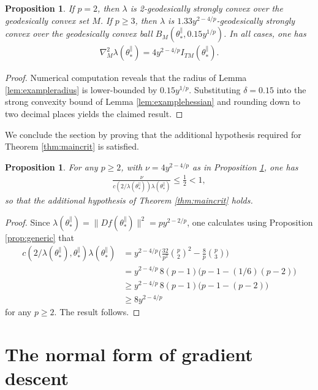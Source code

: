 \documentclass{article}
\newcommand{\tpa}{\theta^{\parallel}}
\theoremstyle{plain}
\newtheorem{proposition}[theorem]{Proposition}
\theoremstyle{definition}
\theoremstyle{remark}
\begin{document}
\begin{proposition}\label{prop:convex}
    If $p=2$, then $\lambda$ is 2-geodesically strongly convex over the geodesically convex set $M$. If $p\geq 3$, then $\lambda$ is $1.33y^{2-4/p}$-geodesically strongly convex over the geodesically convex ball $B_M(\tpa_*,0.15y^{1/p})$. In all cases, one has
    \begin{align}
        \nabla^2_M\lambda(\tpa_*) = 4y^{2-4/p}I_{TM}(\tpa_*).
    \end{align}
\end{proposition}

\begin{proof}
    Numerical computation reveals that the radius of Lemma \ref{lem:exampleradius} is lower-bounded by $0.15y^{1/p}$. Substituting $\delta = 0.15$ into the strong convexity bound of Lemma \ref{lem:examplehessian} and rounding down to two decimal places yields the claimed result.
\end{proof}

We conclude the section by proving that the additional hypothesis required for Theorem \ref{thm:maincrit} is satisfied.

\begin{proposition}\label{prop:additional}
    For any $p\geq 2$, with $\nu = 4y^{2-4/p}$ as in Proposition \ref{prop:convex}, one has
    \begin{align}
        \frac{\nu}{c(2/\lambda(\tpa_*))\lambda(\tpa_*)} \leq\frac{1}{2}<1,
    \end{align}
    so that the additional hypothesis of Theorem \ref{thm:maincrit} holds.
\end{proposition}

\begin{proof}
    Since $\lambda(\tpa_*) = \|Df(\tpa_*)\|^2 = py^{2-2/p}$, one calculates using Proposition \ref{prop:generic} that
    \begin{align}
        c(2/\lambda(\tpa_*),\tpa_*)\lambda(\tpa_*) &= y^{2-4/p}\bigg(\frac{32}{p^2}\binom{p}{2}^2 - \frac{8}{p}\binom{p}{3}\bigg)\\&=y^{2-4/p}\,8(p-1)\big(p-1-(1/6)(p-2)\big)\\&\geq y^{2-4/p}\,8(p-1)\big(p-1-(p-2)\big)\\&\geq 8y^{2-4/p}
    \end{align}
    for any $p\geq 2$. The result follows.
\end{proof}


\section{The normal form of gradient descent}\label{sec:approximatedynamics}
\end{document}
